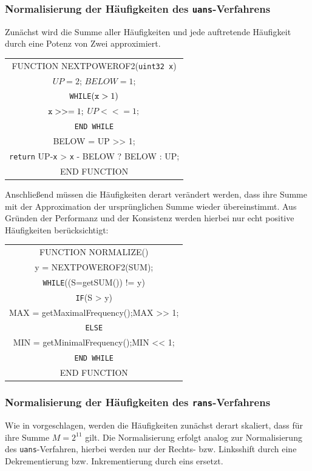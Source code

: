 \documentclass[a4paper,12pt]{article}
\begin{document}
\subsubsection{Normalisierung der Häufigkeiten des {\tt{uans}}-Verfahrens}

Zunächst wird die Summe aller Häufigkeiten und jede auftretende Häufigkeit durch eine Potenz von Zwei approximiert.
\par

\begin{center}
\begin{tabular}{c}
FUNCTION NEXTPOWEROF2({\tt{uint32 x}}) 
\\
$UP=2$; $BELOW=1$; 
\\
{\tt{WHILE}}$({\tt{x}} > 1)$ 
\\
${\tt{x}} >>= 1;$ $UP <<= 1;$
\\
{\tt{END {\tt{WHILE}}}}
\\
BELOW = UP >> 1;  
\\
{\tt{return}} UP-{\tt{x}} > {\tt{x}} - BELOW ? BELOW : UP;
\\
END FUNCTION
\end{tabular} 
\end{center}

Anschließend müssen die Häufigkeiten derart verändert werden, dass ihre Summe mit der Approximation der ursprünglichen Summe wieder übereinstimmt. Aus Gründen der Performanz und der Konsistenz werden hierbei nur echt positive Häufigkeiten berücksichtigt:

\begin{center}
\begin{tabular}{c}
FUNCTION NORMALIZE() 
\\
y = NEXTPOWEROF2(SUM); 
\\
{\tt{WHILE}}((S=getSUM()) != y) 
\\
{\tt{IF}}(S > y)
\\
MAX = getMaximalFrequency();MAX >> 1;
\\
{\tt{ELSE}}
\\
MIN = getMinimalFrequency();MIN << 1;
\\
{\tt{END WHILE}}
\\
END FUNCTION
\end{tabular} 
\end{center}

 
\subsubsection{Normalisierung der Häufigkeiten des {\tt{rans}}-Verfahrens}
Wie in \cite{Krajcevski} vorgeschlagen, werden die Häufigkeiten zunächst derart skaliert, dass für ihre Summe $M= 2^{11}$ gilt. 
Die Normalisierung erfolgt analog zur Normalisierung des {\tt{uans}}-Verfahren, hierbei werden nur der Rechts- bzw. Linksshift durch eine Dekrementierung bzw. Inkrementierung durch eins ersetzt.
\end{document}

